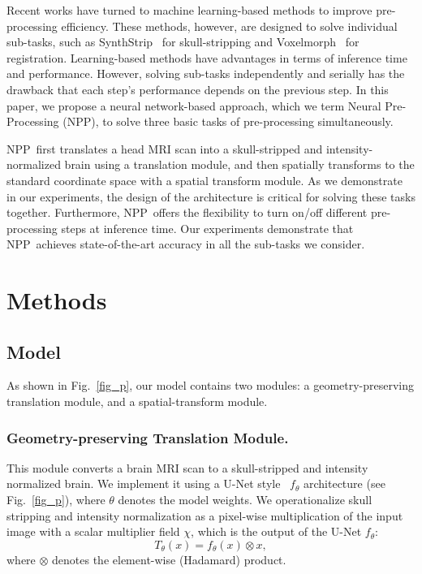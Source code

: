 \documentclass[runningheads]{llncs}
\newcommand{\modelname}{NPP}
\begin{document}
Recent works have turned to machine learning-based methods to improve pre-processing efficiency. 
These methods, however, are designed to solve individual sub-tasks, such as SynthStrip~\cite{hoopes2022synthstrip} for skull-stripping and Voxelmorph~\cite{Balakrishnan2019} for registration. 
Learning-based methods have advantages in terms of inference time and performance.
However, solving sub-tasks independently and serially has the drawback that each step's performance depends on the previous step.
In this paper, we propose a neural network-based approach, which we term Neural Pre-Processing (\modelname), to solve three basic tasks of pre-processing simultaneously. 





\modelname~first translates a head MRI scan into a skull-stripped and intensity-normalized brain using a translation module, and then spatially transforms to the standard coordinate space with a spatial transform module. 
As we demonstrate in our experiments, the design of the architecture is critical for solving these tasks together.
Furthermore, \modelname~offers the flexibility to turn on/off different pre-processing steps at inference time.
Our experiments demonstrate that \modelname~achieves state-of-the-art accuracy in all the sub-tasks we consider.





\section{Methods}


\subsection{Model}

As shown in Fig.~\ref{fig_p}, our model contains two modules: a geometry-preserving translation module, and a spatial-transform module. 


\subsubsection{Geometry-preserving Translation Module.}
\label{sec:intensity-module} This module converts a brain MRI scan to a skull-stripped and intensity normalized brain. 
We implement it using a U-Net style~\cite{ronneberger2015u} $f_\theta$ architecture (see Fig.~\ref{fig_p}), where $\theta$ denotes the model weights. 
We operationalize skull stripping and intensity normalization as a pixel-wise multiplication of the input image with a scalar multiplier field $\chi$, which is the output of the U-Net $f_\theta$: 
\begin{equation}
    T_{\theta}(x) = f_\theta(x) \otimes x,
\end{equation}
where $\otimes$ denotes the element-wise (Hadamard) product. 
\end{document}
